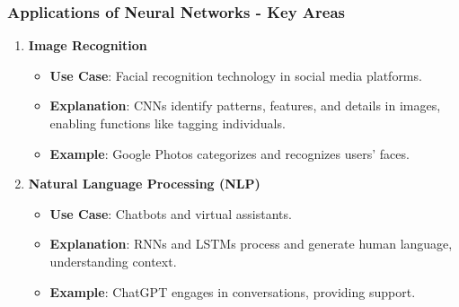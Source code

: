\documentclass[aspectratio=169]{beamer}
\begin{document}
\begin{frame}[fragile]
    \frametitle{Applications of Neural Networks - Key Areas}
    
    \begin{enumerate}
        \item \textbf{Image Recognition}
            \begin{itemize}
                \item \textbf{Use Case}: Facial recognition technology in social media platforms.
                \item \textbf{Explanation}: CNNs identify patterns, features, and details in images, enabling functions like tagging individuals.
                \item \textbf{Example}: Google Photos categorizes and recognizes users' faces.
            \end{itemize}
        
        \item \textbf{Natural Language Processing (NLP)}
            \begin{itemize}
                \item \textbf{Use Case}: Chatbots and virtual assistants.
                \item \textbf{Explanation}: RNNs and LSTMs process and generate human language, understanding context.
                \item \textbf{Example}: ChatGPT engages in conversations, providing support.
            \end{itemize}
    \end{enumerate}
\end{frame}
\end{document}
